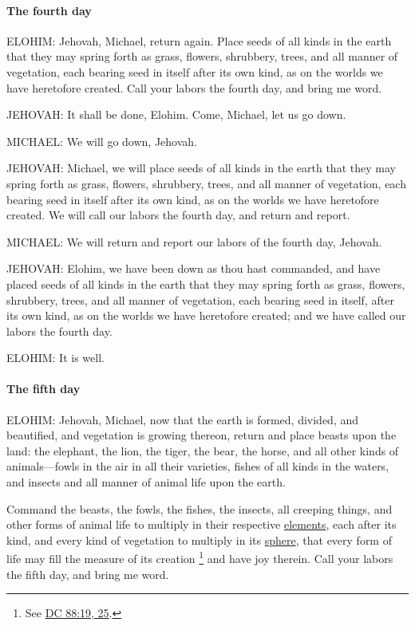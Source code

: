 			\paragraph{The fourth day}
				\label{TEMPLE-ENDOWMENT-ENDOW-PRE-1990-DAY4}
			
				ELOHIM: Jehovah, Michael, return again. Place seeds of all kinds in the earth that they may spring forth as grass, flowers, shrubbery, trees, and all manner of vegetation, each bearing seed in itself after its own kind, as on the worlds we have heretofore created. Call your labors the fourth day, and bring me word.

				JEHOVAH: It shall be done, Elohim. Come, Michael, let us go down.

				MICHAEL: We will go down, Jehovah.

				JEHOVAH: Michael, we will place seeds of all kinds in the earth that they may spring forth as grass, flowers, shrubbery, trees, and all manner of vegetation, each bearing seed in itself after its own kind, as on the worlds we have heretofore created. We will call our labors the fourth day, and return and report.

				MICHAEL: We will return and report our labors of the fourth day, Jehovah.

				JEHOVAH: Elohim, we have been down as thou hast commanded, and have placed seeds of all kinds in the earth that they may spring forth as grass, flowers, shrubbery, trees, and all manner of vegetation, each bearing seed in itself, after its own kind, as on the worlds we have heretofore created; and we have called our labors the fourth day.

				ELOHIM: It is well.
				
			\paragraph{The fifth day}
				\label{TEMPLE-ENDOWMENT-ENDOW-PRE-1990-DAY5}
			
				ELOHIM: Jehovah, Michael, now that the earth is formed, divided, and beautified, and vegetation is growing thereon, return and place beasts upon the land: the elephant, the lion, the tiger, the bear, the horse, and all other kinds of animals---fowls in the air in all their varieties, fishes of all kinds in the waters, and insects and all manner of animal life upon the earth.

				Command the beasts, the fowls, the fishes, the insects, all creeping things, and other forms of animal life to multiply in their respective \hyperref[ELEMENT-1828]{elements}, each after its kind, and every kind of vegetation to multiply in its \hyperref[SPHERE-1828]{sphere}, that every form of life may fill the measure of its creation%
					\footnote{%
						\label{ENDOWMENT-MEASURE}%
						See \hyperref[DC88-19]{DC 88:19, 25}.
						} 
				and have joy therein. Call your labors the fifth day, and bring me word.

